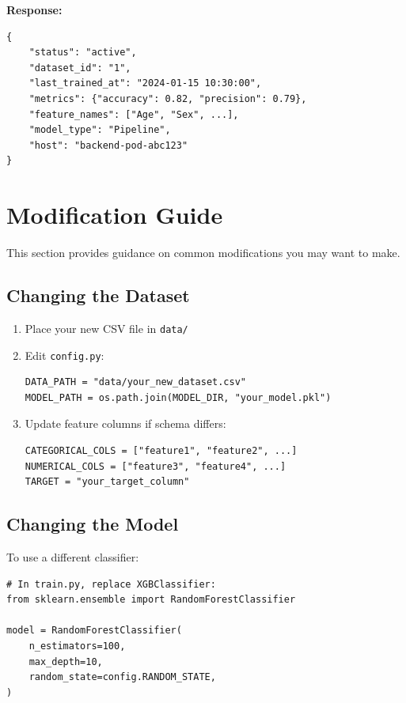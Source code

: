 \documentclass[11pt,a4paper]{article}
\begin{document}
\textbf{Response:}
\begin{lstlisting}[style=pythonstyle]
{
    "status": "active",
    "dataset_id": "1",
    "last_trained_at": "2024-01-15 10:30:00",
    "metrics": {"accuracy": 0.82, "precision": 0.79},
    "feature_names": ["Age", "Sex", ...],
    "model_type": "Pipeline",
    "host": "backend-pod-abc123"
}
\end{lstlisting}

\section{Modification Guide}

This section provides guidance on common modifications you may want to make.

\subsection{Changing the Dataset}

\begin{enumerate}
    \item Place your new CSV file in \texttt{data/}
    \item Edit \texttt{config.py}:
\begin{lstlisting}[style=pythonstyle]
DATA_PATH = "data/your_new_dataset.csv"
MODEL_PATH = os.path.join(MODEL_DIR, "your_model.pkl")
\end{lstlisting}
    \item Update feature columns if schema differs:
\begin{lstlisting}[style=pythonstyle]
CATEGORICAL_COLS = ["feature1", "feature2", ...]
NUMERICAL_COLS = ["feature3", "feature4", ...]
TARGET = "your_target_column"
\end{lstlisting}
\end{enumerate}

\subsection{Changing the Model}

To use a different classifier:

\begin{lstlisting}[style=pythonstyle]
# In train.py, replace XGBClassifier:
from sklearn.ensemble import RandomForestClassifier

model = RandomForestClassifier(
    n_estimators=100,
    max_depth=10,
    random_state=config.RANDOM_STATE,
)
\end{lstlisting}
\end{document}
